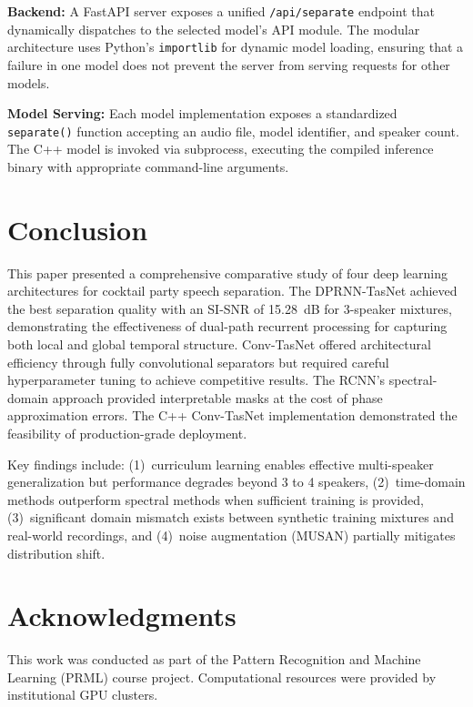 \documentclass[conference]{IEEEtran}
\begin{document}
\textbf{Backend:} A FastAPI server exposes a unified \texttt{/api/separate} endpoint that dynamically dispatches to the selected model's API module. The modular architecture uses Python's \texttt{importlib} for dynamic model loading, ensuring that a failure in one model does not prevent the server from serving requests for other models.

\textbf{Model Serving:} Each model implementation exposes a standardized \texttt{separate()} function accepting an audio file, model identifier, and speaker count. The C++ model is invoked via subprocess, executing the compiled inference binary with appropriate command-line arguments.

\section{Conclusion}
\label{sec:conclusion}

This paper presented a comprehensive comparative study of four deep learning architectures for cocktail party speech separation. The DPRNN-TasNet achieved the best separation quality with an SI-SNR of 15.28~dB for 3-speaker mixtures, demonstrating the effectiveness of dual-path recurrent processing for capturing both local and global temporal structure. Conv-TasNet offered architectural efficiency through fully convolutional separators but required careful hyperparameter tuning to achieve competitive results. The RCNN's spectral-domain approach provided interpretable masks at the cost of phase approximation errors. The C++ Conv-TasNet implementation demonstrated the feasibility of production-grade deployment.

Key findings include: (1)~curriculum learning enables effective multi-speaker generalization but performance degrades beyond 3 to 4 speakers, (2)~time-domain methods outperform spectral methods when sufficient training is provided, (3)~significant domain mismatch exists between synthetic training mixtures and real-world recordings, and (4)~noise augmentation (MUSAN) partially mitigates distribution shift.



\section*{Acknowledgments}

This work was conducted as part of the Pattern Recognition and Machine Learning (PRML) course project. Computational resources were provided by institutional GPU clusters.
\end{document}
